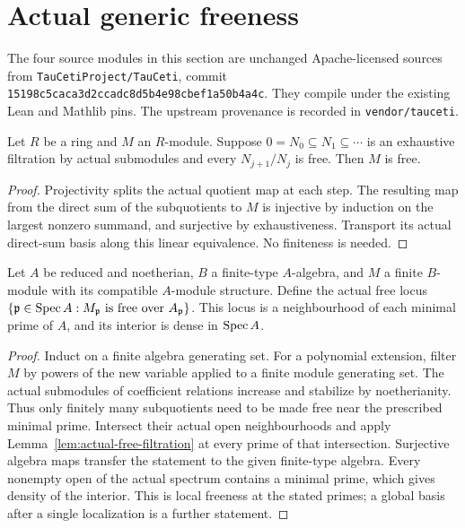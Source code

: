 \section{Actual generic freeness}

The four source modules in this section are unchanged Apache-licensed sources from
\texttt{TauCetiProject/TauCeti}, commit
\texttt{15198c5caca3d2ccadc8d5b4e98cbef1a50b4a4c}. They compile under the existing
Lean and Mathlib pins. The upstream provenance is recorded in
\texttt{vendor/tauceti}.

\begin{lemma}\label{lem:actual-free-filtration}
\leanok
{}
Let $R$ be a ring and $M$ an $R$-module. Suppose
$0=N_0\subseteq N_1\subseteq\cdots$ is an exhaustive filtration by actual
submodules and every $N_{j+1}/N_j$ is free. Then $M$ is free.
\end{lemma}

\begin{proof}
Projectivity splits the actual quotient map at each step. The resulting map
from the direct sum of the subquotients to $M$ is injective by induction on the
largest nonzero summand, and surjective by exhaustiveness. Transport its actual
direct-sum basis along this linear equivalence. No finiteness is needed.
\end{proof}

\begin{theorem}\label{thm:actual-local-generic-freeness}
\leanok
{}
Let $A$ be reduced and noetherian, $B$ a finite-type $A$-algebra, and $M$ a finite
$B$-module with its compatible $A$-module structure. Define the actual free locus
$\{\mathfrak p\in\operatorname{Spec} A:M_{\mathfrak p}\text{ is free over }A_{\mathfrak p}\}$.
This locus is a neighbourhood of each minimal prime of $A$, and its interior
is dense in $\operatorname{Spec} A$.
\end{theorem}

\begin{proof}
Induct on a finite algebra generating set. For a polynomial extension, filter
$M$ by powers of the new variable applied to a finite module generating set.
The actual submodules of coefficient relations increase and stabilize by
noetherianity. Thus only finitely many subquotients need to be made free near
the prescribed minimal prime. Intersect their actual open neighbourhoods and
apply Lemma~\ref{lem:actual-free-filtration} at every prime of that intersection.
Surjective algebra maps transfer the statement to the given finite-type algebra.
Every nonempty open of the actual spectrum contains a minimal prime, which
gives density of the interior. This is local freeness at the stated primes;
a global basis after a single localization is a further statement.
\end{proof}
